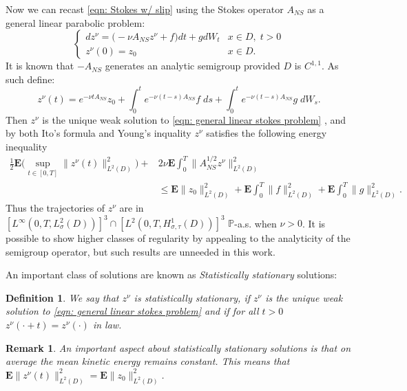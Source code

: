 \documentclass[11pt, reqno]{article}
\newtheorem{definition}[theorem]{Definition}
\newtheorem{remark}[theorem]{Remark}
\def\E{\mathbf{E}}
\def\P{{\mathbb P}}
\begin{document}
Now we can recast \eqref{eqn: Stokes w/ slip} using the Stokes operator $A_{NS}$ as a general linear parabolic problem: 
\begin{equation}\label{eqn: general linear stokes problem}
    \begin{cases}
        dz^\nu = \big(-\nu A_{NS}z^\nu  + f\big)dt + gdW_t & x \in D,\; t > 0\\
        z^\nu(0) = z_0 & x \in D.
    \end{cases}
\end{equation}
It is known that $-A_{NS}$ generates an analytic semigroup provided $D$ is $C^{1,1}$\cite{ter2020holder}. As such define:
\[
    z^\nu(t) = e^{-\nu tA_{NS}}z_0 + \int_0^t e^{-\nu(t-s)A_{NS}}f\;ds + \int_0^t e^{-\nu(t-s)A_{NS}}g\;dW_s. 
\]
Then $z^\nu$ is the unique weak solution to \eqref{eqn: general linear stokes problem} \cite{da2014stochastic}, and by both Ito's formula and Young's inquality $z^\nu$ satisfies the following energy inequality
\begin{align}\label{eqn: Stokes energy uniform bounds}
    \frac{1}{2}\E\big(\sup_{t \in [0,T]}\|z^\nu(t)\|_{L^2(D)}^2\big) +  &2\nu\E\int_0^T\|A_{NS}^{1/2}z^\nu\|_{L^2(D)}^2\\
    &\leq \E\|z_0\|_{L^2(D)}^2 + \E\int_0^T\|f\|_{L^2(D)}^2 + \E\int_0^T\|g\|_{L^2(D)}^2.\nonumber
\end{align}
Thus the trajectories of $z^\nu$ are in $[L^\infty(0,T, L_\sigma^2(D))]^3 \cap [L^2(0,T, H_{\sigma, \tau}^1(D))]^3$ $\P$-a.s. when $\nu > 0$. It is possible to show higher classes of regularity by appealing to the analyticity of the semigroup operator, but such results are unneeded in this work. 

An important class of solutions are known as \textit{Statistically stationary} solutions:
\begin{definition}
    We say that $z^\nu$ is statistically stationary, if $z^\nu$ is the unique weak solution to \eqref{eqn: general linear stokes problem} and if for all $t > 0$
    $z^\nu(\cdot + t) = z^\nu(\cdot)$ in law. 
\end{definition}
\begin{remark}
    An important aspect about statistically stationary solutions is that on average the mean kinetic energy remains constant. This means that $\E\|z^\nu(t)\|_{L^2(D)}^2 = \E\|z_0\|_{L^2(D)}^2$.
\end{remark}
\end{document}
